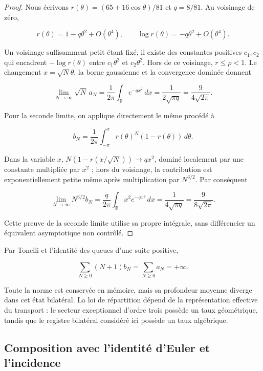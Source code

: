 \begin{proof}
Nous écrivons \(r(\theta)=(65+16\cos\theta)/81\) et \(q=8/81\). Au voisinage de zéro,

\[
r(\theta)=1-q\theta^2+O(\theta^4),\qquad
\log r(\theta)=-q\theta^2+O(\theta^4).
\]

Un voisinage suffisamment petit étant fixé, il existe des constantes positives \(c_1,c_2\) qui encadrent \(-\log r(\theta)\) entre \(c_1\theta^2\) et \(c_2\theta^2\). Hors de ce voisinage, \(r\leq\rho<1\). Le changement \(x=\sqrt N\theta\), la borne gaussienne et la convergence dominée donnent

\[
\lim_{N\to\infty}\sqrt N\,a_N
=\frac1{2\pi}\int_{\mathbb R}e^{-qx^2}\,dx
=\frac1{2\sqrt{\pi q}}=\frac9{4\sqrt{2\pi}}.
\]

Pour la seconde limite, on applique directement le même procédé à


\[
b_N=\frac1{2\pi}\int_{-\pi}^{\pi}r(\theta)^N(1-r(\theta))\,d\theta.
\]

Dans la variable \(x\), \(N(1-r(x/\sqrt N))\to qx^2\), dominé localement par une constante multipliée par \(x^2\) ; hors du voisinage, la contribution est exponentiellement petite même après multiplication par \(N^{3/2}\). Par conséquent

\[
\lim_{N\to\infty}N^{3/2}b_N
=\frac q{2\pi}\int_{\mathbb R}x^2e^{-qx^2}\,dx
=\frac1{4\sqrt{\pi q}}=\frac9{8\sqrt{2\pi}}.
\]

Cette preuve de la seconde limite utilise sa propre intégrale, sans différencier un équivalent asymptotique non contrôlé.

\end{proof}

Par Tonelli et l’identité des queues d’une suite positive,


\begin{equation}
\sum_{N\geq0}(N+1)b_N=\sum_{N\geq0}a_N=+\infty.
\label{nuc03:eq:21}
\end{equation}

Toute la norme est conservée en mémoire, mais sa profondeur moyenne diverge dans cet état bilatéral. La loi de répartition dépend de la représentation effective du transport : le secteur exceptionnel d’ordre trois possède un taux géométrique, tandis que le registre bilatéral considéré ici possède un taux algébrique.

\subsection{Composition avec l’identité d’Euler et l’incidence}

